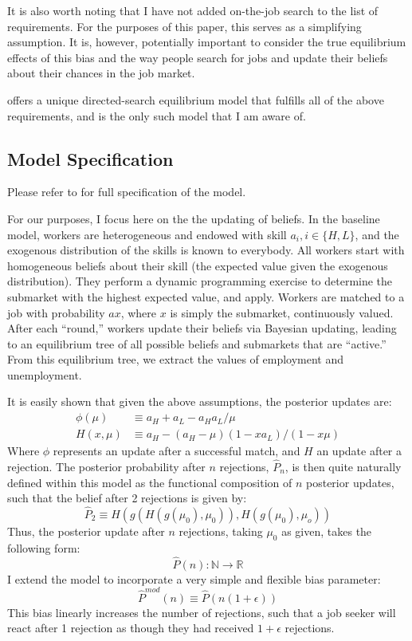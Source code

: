 \documentclass[a4paper,12pt]{article}
\begin{document}
It is also worth noting that I have not added on-the-job search to the list of requirements. For the purposes of this paper, this serves as a simplifying assumption. It is, however, potentially important to consider the true equilibrium effects of this bias and the way people search for jobs and update their beliefs about their chances in the job market.

\cite{gonzalez2010} offers a unique directed-search equilibrium model that fulfills all of the above requirements, and is the only such model that I am aware of.

\subsection{ Model Specification }

Please refer to \cite{gonzalez2010} for full specification of the model.

For our purposes, I focus here on the the updating of beliefs. In the baseline model, workers are heterogeneous and endowed with skill $a_i, i \in \{ H, L \}$, and the exogenous distribution of the skills is known to everybody. All workers start with homogeneous beliefs about their skill (the expected value given the exogenous distribution). They perform a dynamic programming exercise to determine the submarket with the highest expected value, and apply. Workers are matched to a job with probability $ax$, where $x$ is simply the submarket, continuously valued. After each ``round,'' workers update their beliefs via Bayesian updating, leading to an equilibrium tree of all possible beliefs and submarkets that are ``active.'' From this equilibrium tree, we extract the values of employment and unemployment.

It is easily shown that given the above assumptions, the posterior updates are:
%
\begin{align*}
  \phi(\mu) &\equiv  a_H + a_L - a_Ha_L/\mu \\
  H(x, \mu) &\equiv a_H - (a_H - \mu)(1 - xa_L)/(1 - x\mu)
\end{align*}
%
Where $\phi$ represents an update after a successful match, and $H$ an update after a rejection. The posterior probability after $n$ rejections, $\hat{P}_n$, is then quite naturally defined within this model as the functional composition of $n$ posterior updates, such that the belief after 2 rejections is given by:
$$
\hat{P}_2 \equiv H(g(H(g(\mu_0), \mu_0)), H(g(\mu_0),\mu_o))
$$
Thus, the posterior update after $n$ rejections, taking $\mu_0$ as given, takes the following form:
%
$$
\hat{P}(n): \mathbb{N} \rightarrow \mathbb{R}
$$
%
I extend the model to incorporate a very simple and flexible bias parameter:
%
$$
\hat{P}^{mod}(n) \equiv \hat{P} (n(1 + \epsilon))
$$
This bias linearly increases the number of rejections, such that a job seeker will react after 1 rejection as though they had received $1 + \epsilon$ rejections.
\end{document}
